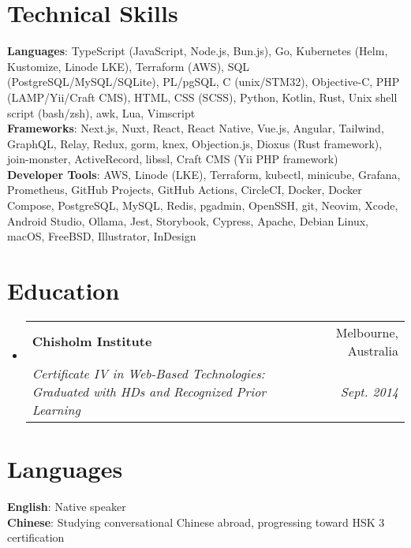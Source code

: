 \documentclass[letterpaper,11pt]{article}
\makeatletter
\newcommand{\resumeSubheading}[4]{
  \vspace{-2pt}\item
    \begin{tabular*}{0.97\textwidth}[t]{l@{\extracolsep{\fill}}r}
      \textbf{#1} & #2 \\
      \textit{\small#3} & \textit{\small #4} \\
    \end{tabular*}\vspace{-7pt}
}
\newcommand{\resumeSubHeadingListStart}{\begin{itemize}[leftmargin=0.15in, label={}]}
\newcommand{\resumeSubHeadingListEnd}{\end{itemize}}
\makeatother
\begin{document}
%
\section{Technical Skills}
 \begin{itemize}[leftmargin=0.15in, label={}]
    \small{\item{
     \textbf{Languages}{: TypeScript (JavaScript, Node.js, Bun.js), Go, Kubernetes (Helm, Kustomize, Linode LKE), Terraform (AWS), SQL (PostgreSQL/MySQL/SQLite), PL/pgSQL, C (unix/STM32), Objective-C, PHP (LAMP/Yii/Craft CMS), HTML, CSS (SCSS), Python, Kotlin, Rust, Unix shell script (bash/zsh), awk, Lua, Vimscript} \\
     \textbf{Frameworks}{: Next.js, Nuxt, React, React Native, Vue.js, Angular, Tailwind, GraphQL, Relay, Redux, gorm, knex, Objection.js, Dioxus (Rust framework), join-monster, ActiveRecord, libssl, Craft CMS (Yii PHP framework)} \\
     \textbf{Developer Tools}{: AWS, Linode (LKE), Terraform, kubectl, minicube, Grafana, Prometheus, GitHub Projects, GitHub Actions, CircleCI, Docker, Docker Compose, PostgreSQL, MySQL, Redis, pgadmin, OpenSSH, git, Neovim, Xcode, Android Studio, Ollama, Jest, Storybook, Cypress, Apache, Debian Linux, macOS, FreeBSD, Illustrator, InDesign} \\
    }}
 \end{itemize}

\section{Education}
\resumeSubHeadingListStart
  \resumeSubheading
    {Chisholm Institute}{Melbourne, Australia}
    {Certificate IV in Web-Based Technologies: Graduated with HDs and Recognized Prior Learning}{Sept. 2014}
\resumeSubHeadingListEnd


\section{Languages}
 \begin{itemize}[leftmargin=0.15in, label={}]
    \small{\item{
     \textbf{English}{: Native speaker} \\
     \textbf{Chinese}{: Studying conversational Chinese abroad, progressing toward HSK 3 certification} \\
    }}
 \end{itemize}

\end{document}

